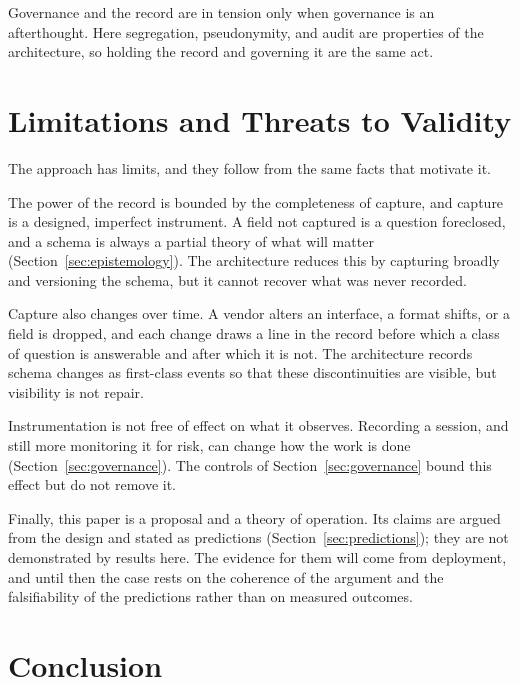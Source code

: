 \documentclass[11pt]{article}
\begin{document}
Governance and the record are in tension only when governance is an afterthought.
Here segregation, pseudonymity, and audit are properties of the architecture, so
holding the record and governing it are the same act.

\section{Limitations and Threats to Validity}
\label{sec:limits}

The approach has limits, and they follow from the same facts that motivate it.

The power of the record is bounded by the completeness of capture, and capture is a
designed, imperfect instrument. A field not captured is a question foreclosed, and a
schema is always a partial theory of what will matter
(Section~\ref{sec:epistemology}). The architecture reduces this by capturing broadly
and versioning the schema, but it cannot recover what was never recorded.

Capture also changes over time. A vendor alters an interface, a format shifts, or a
field is dropped, and each change draws a line in the record before which a class of
question is answerable and after which it is not. The architecture records schema
changes as first-class events so that these discontinuities are visible, but
visibility is not repair.

Instrumentation is not free of effect on what it observes. Recording a session, and
still more monitoring it for risk, can change how the work is done
(Section~\ref{sec:governance}). The controls of Section~\ref{sec:governance} bound
this effect but do not remove it.

Finally, this paper is a proposal and a theory of operation. Its claims are argued
from the design and stated as predictions (Section~\ref{sec:predictions}); they are
not demonstrated by results here. The evidence for them will come from deployment,
and until then the case rests on the coherence of the argument and the
falsifiability of the predictions rather than on measured outcomes.

\section{Conclusion}
\end{document}

